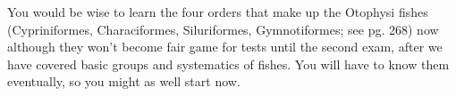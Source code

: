\documentclass[nofonts, letterpaper]{tufte-handout}
\begin{document}
You would be wise to learn the four orders that make up the Otophysi fishes (Cypriniformes, Characiformes, Siluriformes, Gymnotiformes; see pg. 268) now although they won’t become fair game for tests until the second exam, after we have covered basic groups and systematics of fishes.  You will have to know them eventually, so you might as well start now.
\end{document}
